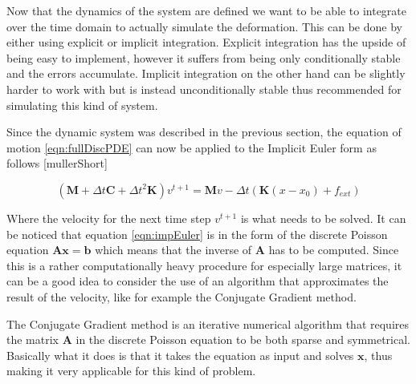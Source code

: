 Now that the dynamics of the system are defined we want to be able to integrate over the time domain to actually simulate the deformation. This can be done by either using explicit or implicit integration. Explicit integration has the upside of being easy to implement, however it suffers from being only conditionally stable and the errors accumulate. Implicit integration on the other hand can be slightly harder to work with but is instead unconditionally stable thus recommended for simulating this kind of system. 

Since the dynamic system was described in the previous section, the equation of motion \ref{eqn:fullDiscPDE} can now be applied to the Implicit Euler form as follows [mullerShort]

\begin{equation}\label{eqn:impEuler}
		(\mathbf{M} + \Delta t  \mathbf{C} + \Delta t^2 \mathbf{K})v^{t+1} = \mathbf{M} v - \Delta t (\mathbf{K}(x - x_0) + f_{ext})
\end{equation}

Where the velocity for the next time step $v^{t+1}$ is what needs to be solved. It can be noticed that equation \ref{eqn:impEuler} is in the form of the discrete Poisson equation $\mathbf{Ax=b}$ which means that the inverse of $\mathbf{A}$ has to be computed. Since this is a rather computationally heavy procedure for especially large matrices, it can be a good idea to consider the use of an algorithm that approximates the result of the velocity, like for example the Conjugate Gradient method.

The Conjugate Gradient method is an iterative numerical algorithm that requires the matrix $\mathbf{A}$ in the discrete Poisson equation to be both sparse and symmetrical. Basically what it does is that it takes the equation as input and solves $\mathbf{x}$, thus making it very applicable for this kind of problem.